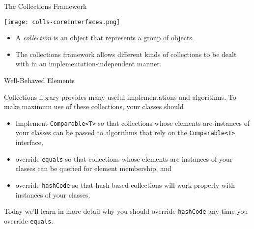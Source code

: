 \documentclass{beamer}
\begin{document}
\begin{frame}
  \titlepage
\end{frame}


\begin{frame}[fragile]{The Collections Framework}

\begin{center}
\texttt{[image: colls-coreInterfaces.png]}
\end{center}

\begin{itemize}
\item A {\it collection} is an object that represents a group of objects.
\item The collections framework allows different kinds of collections to be dealt with in an implementation-independent manner.
\end{itemize}


\end{frame}

\begin{frame}[fragile]{Well-Behaved Elements}

Collections library provides many useful implementations and algorithms.  To make maximum use of these collections, your classes should
\begin{itemize}
\item Implement {\tt Comparable<T>} so that collections whose elements are instances of your classes can be passed to algorithms that rely on the {\tt Comparable<T>} interface,
\item override {\tt equals} so that collections whose elements are instances of your classes can be queried for element membership, and
\item override {\tt hashCode} so that hash-based collections will work properly with instances of your classes.
\end{itemize}

Today we'll learn in more detail why you should override {\tt hashCode} any time you override {\tt equals}.

\end{frame}
\end{document}

